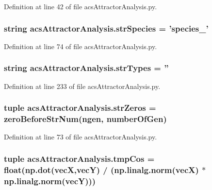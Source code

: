 Definition at line 42 of file acs\-Attractor\-Analysis.\-py.

\hypertarget{a00096_aa76707ba3058ba96fc8e5aeafa461193}{
\subsubsection[{str\-Species}]{\setlength{\rightskip}{0pt plus 5cm}string acs\-Attractor\-Analysis.\-str\-Species = 'species\-\_\-'}}\label{a00096_aa76707ba3058ba96fc8e5aeafa461193}


Definition at line 74 of file acs\-Attractor\-Analysis.\-py.

\hypertarget{a00096_ae5f324ca114055fca79473eecd17bb80}{
\subsubsection[{str\-Types}]{\setlength{\rightskip}{0pt plus 5cm}string acs\-Attractor\-Analysis.\-str\-Types = ''}}\label{a00096_ae5f324ca114055fca79473eecd17bb80}


Definition at line 233 of file acs\-Attractor\-Analysis.\-py.

\hypertarget{a00096_a5708d1d44920d75a918ec1c988c02c57}{
\subsubsection[{str\-Zeros}]{\setlength{\rightskip}{0pt plus 5cm}tuple acs\-Attractor\-Analysis.\-str\-Zeros = {\bf zero\-Before\-Str\-Num}(ngen, {\bf number\-Of\-Gen})}}\label{a00096_a5708d1d44920d75a918ec1c988c02c57}


Definition at line 73 of file acs\-Attractor\-Analysis.\-py.

\hypertarget{a00096_a305669433b259c5ffcb797769e7c30df}{
\subsubsection[{tmp\-Cos}]{\setlength{\rightskip}{0pt plus 5cm}tuple acs\-Attractor\-Analysis.\-tmp\-Cos = float(np.\-dot({\bf vec\-X},{\bf vec\-Y}) / (np.\-linalg.\-norm({\bf vec\-X}) $\ast$ np.\-linalg.\-norm({\bf vec\-Y})))}}\label{a00096_a305669433b259c5ffcb797769e7c30df}


